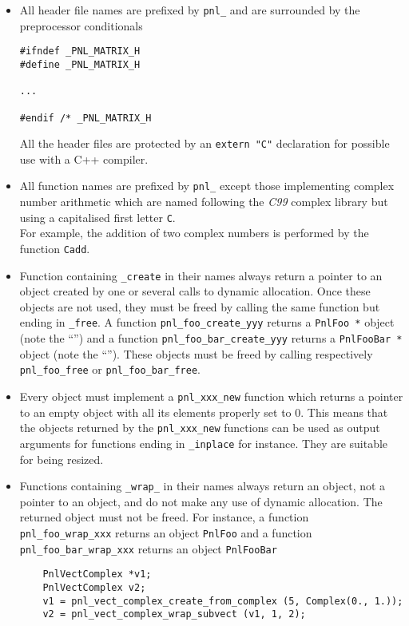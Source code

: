 \documentclass[a4paper,11pt,twoside]{article}
\newcommand{\ptr}{\textasteriskcentered}
\begin{document}
\begin{itemize}
  \item All header file names are prefixed by \verb!pnl_! and are surrounded by
    the preprocessor conditionals
\begin{verbatim}
#ifndef _PNL_MATRIX_H
#define _PNL_MATRIX_H

...

#endif /* _PNL_MATRIX_H
\end{verbatim}
All the header files are protected by an \verb!extern "C"! declaration for
possible use with a C++ compiler.

  \item All function names are prefixed by \verb!pnl_! except those implementing
    complex number arithmetic which are named following the \textit{C99}
    complex library but using a capitalised first letter \verb!C!. \\
    For example, the addition of two complex numbers is performed by the
    function \verb!Cadd!.

  \item Function containing \verb!_create! in their names always return a
    pointer to an object created by one or several calls to dynamic
    allocation. Once these objects are not used, they must be freed by calling
    the same function but ending in \verb!_free!.
    A function \verb!pnl_foo_create_yyy! returns a \verb!PnlFoo *! object (note
    the ``\ptr'') and a function \verb!pnl_foo_bar_create_yyy! returns a
    \verb!PnlFooBar *! object (note the ``\ptr'').
    These objects must be freed by calling respectively \verb!pnl_foo_free! or
    \verb!pnl_foo_bar_free!.
    
  \item Every object must implement a \verb!pnl_xxx_new! function which returns
    a pointer to an empty object with all its elements properly set to $0$. This
    means that the objects returned by the \verb!pnl_xxx_new! functions can be
    used as output arguments for functions ending in \verb!_inplace! for
    instance. They are suitable for being resized. 

  \item Functions containing \verb!_wrap_! in their names always return an
    object, not a pointer to an object, and do not make any use of dynamic
    allocation. The returned object must not be freed. 
    For instance, a function \verb!pnl_foo_wrap_xxx! returns an object
    \verb!PnlFoo! and a function \verb!pnl_foo_bar_wrap_xxx! returns an object
    \verb!PnlFooBar! 
    \begin{verbatim}
    PnlVectComplex *v1;
    PnlVectComplex v2;
    v1 = pnl_vect_complex_create_from_complex (5, Complex(0., 1.));
    v2 = pnl_vect_complex_wrap_subvect (v1, 1, 2);


\end{verbatim}
\end{itemize}
\end{document}
